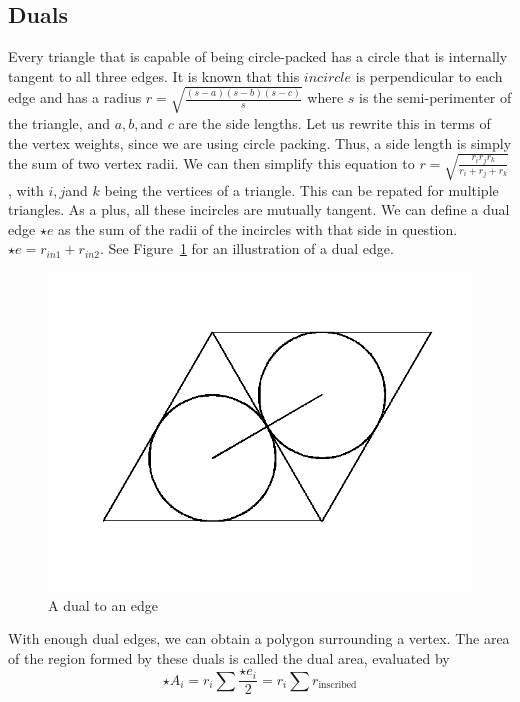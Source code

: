 \documentclass[12pt]{article}
\begin{document}
\subsection{Duals}
\maketitle

Every triangle that is capable of being circle-packed has a circle that is internally tangent to all three edges. It is known that this $incircle$ is perpendicular to each edge and has a radius $\displaystyle r = \sqrt{\frac{(s-a)(s-b)(s-c)}{s}}$ where $s$ is the semi-perimenter of the triangle, and $a, b, $and $c$ are the side lengths. Let us rewrite this in terms of the vertex weights, since we are using circle packing. Thus, a side length is simply the sum of two vertex radii. We can then simplify this equation to $\displaystyle r = \sqrt{\frac{r_i r_j r_k}{r_i + r_j + r_k}}$, with $i, j $and $k$ being the vertices of a triangle. This can be repated for multiple triangles. As a plus, all these incircles are mutually tangent. We can define a dual edge $\star e$ as the sum of the radii of the incircles with that side in question. $\star e = r_{in1} + r_{in2}$. See Figure~\ref{fig:dual} for an illustration of a dual edge.\newline

\begin{figure}
\centering
\includegraphics[scale = 0.4]{dual.png}
\caption{A dual to an edge}
\label{fig:dual}
\end{figure}

\noindent With enough dual edges, we can obtain a polygon surrounding a vertex. The area of the region formed by these duals is called the dual area, evaluated by $$\star A_i = r_i\sum{\frac{\star e_i}{2}} = r_i\sum{r_{\mbox{inscribed}}}$$
\end{document}
